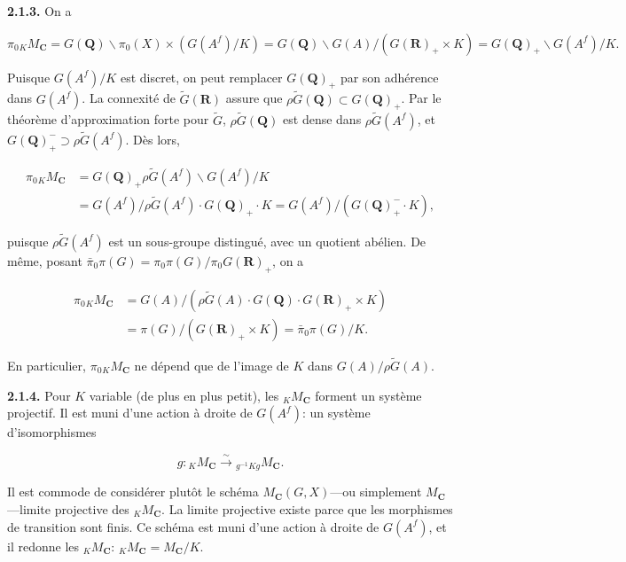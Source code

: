 \documentclass[10pt,a4paper]{article}
\begin{document}
\textbf{2.1.3.} On a

\[
\pi_0{}_K M_{\mathbf C}
=G(\mathbf Q)\backslash\pi_0(X)\times(G(A^f)/K)
=G(\mathbf Q)\backslash G(A)/(G(\mathbf R)_+\times K)
=G(\mathbf Q)_+\backslash G(A^f)/K.
\]

Puisque \(G(A^f)/K\) est discret, on peut remplacer \(G(\mathbf Q)_+\) par son adhérence dans \(G(A^f)\). La connexité de \(\widetilde G(\mathbf R)\) assure que \(\rho\widetilde G(\mathbf Q)\subset G(\mathbf Q)_+\). Par le théorème d'approximation forte pour \(\widetilde G\), \(\rho\widetilde G(\mathbf Q)\) est dense dans \(\rho\widetilde G(A^f)\), et \(G(\mathbf Q)_+^{-}\supset\rho\widetilde G(A^f)\). Dès lors,

\[
\tag{2.1.3.1}
\begin{aligned}
\pi_0{}_K M_{\mathbf C}
&=G(\mathbf Q)_+\rho\widetilde G(A^f)\backslash G(A^f)/K\\
&=G(A^f)/\rho\widetilde G(A^f)\cdot G(\mathbf Q)_+\cdot K
 =G(A^f)/(G(\mathbf Q)_+^{-}\cdot K),
\end{aligned}
\]

puisque \(\rho\widetilde G(A^f)\) est un sous-groupe distingué, avec un quotient abélien. De même, posant \(\bar\pi_0\pi(G)=\pi_0\pi(G)/\pi_0G(\mathbf R)_+\), on a

\[
\tag{2.1.3.2}
\begin{aligned}
\pi_0{}_K M_{\mathbf C}
&=G(A)/(\rho\widetilde G(A)\cdot G(\mathbf Q)\cdot G(\mathbf R)_+\times K)\\
&=\pi(G)/(G(\mathbf R)_+\times K)
 =\bar\pi_0\pi(G)/K.
\end{aligned}
\]

En particulier, \(\pi_0{}_K M_{\mathbf C}\) ne dépend que de l'image de \(K\) dans \(G(A)/\rho\widetilde G(A)\).

\textbf{2.1.4.} Pour \(K\) variable (de plus en plus petit), les \({}_K M_{\mathbf C}\) forment un système projectif. Il est muni d'une action à droite de \(G(A^f)\): un système d'isomorphismes

\[
g:{}_K M_{\mathbf C}\xrightarrow{\sim}{}_{g^{-1}Kg}M_{\mathbf C}.
\]

Il est commode de considérer plutôt le schéma \(M_{\mathbf C}(G,X)\)---ou simplement \(M_{\mathbf C}\)---limite projective des \({}_K M_{\mathbf C}\). La limite projective existe parce que les morphismes de transition sont finis. Ce schéma est muni d'une action à droite de \(G(A^f)\), et il redonne les \({}_K M_{\mathbf C}\): \({}_K M_{\mathbf C}=M_{\mathbf C}/K\).
\end{document}
